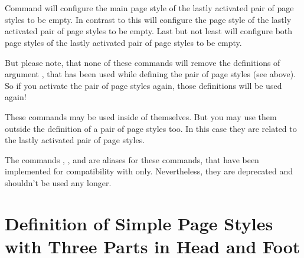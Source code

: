 \begin{Declaration}
  \\
  \\
\end{Declaration}
%
%
%
Command  will configure the main page style
of the lastly activated pair of page styles to be empty. In contrast to this
 will configure the  page
style of the lastly activated pair of page styles to be empty. Last but not
least  will configure both page styles of the
lastly activated pair of page styles to be empty.

But please note, that none of these commands will remove
the definitions of argument , that has been used while
defining the pair of page styles (see above). So if you activate the pair of
page styles again, those definitions will be used again!

These commands may be used inside of  themselves. But you
may use them outside the definition of a pair of page styles too. In this case
they are related to the lastly activated pair of page styles.

%
%
%
The commands , , and
 are aliases for these commands, that have been
implemented for compatibility with  only. Nevertheless, they
are deprecated and shouldn't be used any longer.%
%
%
%
%
%
%
%


\section{Definition of Simple Page Styles with Three Parts in Head and Foot }
\label{sec:scrlayer-scrpage.pagestyle.triple}

